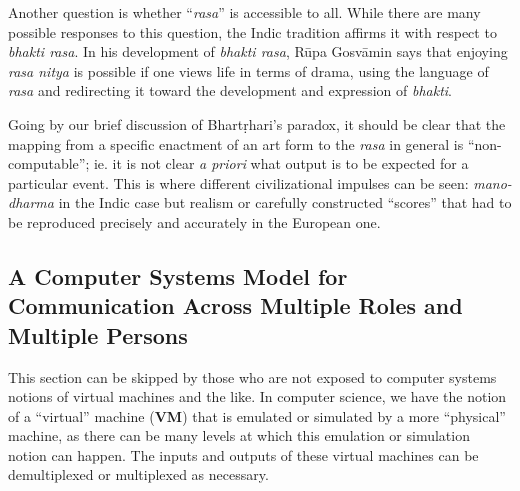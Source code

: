 Another question is whether “\textsl{rasa}” is accessible to all. While there are many possible responses to this question, the Indic tradition affirms it with respect to \textsl{bhakti rasa}.  In his development of \textsl{bhakti rasa}, Rūpa Gosvāmin says that enjoying \textsl{rasa nitya} is possible if one views life in terms of drama, using the language of \textsl{rasa} and redirecting it toward the development and expression of \textsl{bhakti}.

Going by our brief discussion of Bhartṛhari’s paradox, it should be clear that the mapping from a specific enactment of an art form to the \textsl{rasa} in general is “non-computable”; ie. it is not clear \textsl{a priori} what output is to be expected for a particular event. This is where different civilizational impulses can be seen: \textsl{mano-dharma} in the Indic case but realism or carefully constructed “scores” that had to be reproduced precisely and accurately in the European one. 

\subsection{A Computer Systems Model for Communication Across Multiple Roles and Multiple Persons}\label{chap3-sec4.2}

This section can be skipped by those who are not exposed to computer systems notions of virtual machines and the like. In computer science, we have the notion of a “virtual” machine (\textbf{VM}) that is emulated or simulated by a more “physical” machine, as there can be many levels at which this emulation or simulation notion can happen. The inputs and outputs of these virtual machines can be demultiplexed or multiplexed as necessary.

